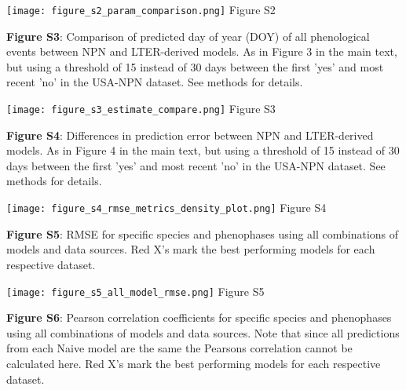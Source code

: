 \documentclass[a4paper,12pt]{article}
\begin{document}
\newpage

\begin{center}
	\centering
		\texttt{[image: figure\_s2\_param\_comparison.png]}
	Figure S2
\end{center}

\newpage

\newpage

\textbf{Figure S3}: Comparison of predicted day of year (DOY) of all phenological events between NPN
and LTER-derived models. As in Figure 3 in the main text, but using a threshold of 15 instead of 30 days between the first 'yes' and most recent 'no' in the USA-NPN dataset. See methods for details. 

\newpage

\begin{center}
	\centering
		\texttt{[image: figure\_s3\_estimate\_compare.png]}
	Figure S3
\end{center}

\newpage

\newpage

\textbf{Figure S4}: Differences in prediction error between NPN and LTER-derived models. As in Figure 4 in the main text, but using a threshold of 15 instead of 30 days between the first 'yes' and most recent 'no' in the USA-NPN dataset. See methods for details. 

\newpage

\begin{center}
	\centering
		\texttt{[image: figure\_s4\_rmse\_metrics\_density\_plot.png]}
	Figure S4
\end{center}

\newpage

\newpage

\textbf{Figure S5}: RMSE for specific species and phenophases using all combinations of models and data sources. Red X's mark the best performing models for each respective dataset. 

\newpage

\begin{center}
	\centering
		\texttt{[image: figure\_s5\_all\_model\_rmse.png]}
	Figure S5
\end{center}

\newpage
\textbf{Figure S6}: Pearson correlation coefficients for specific species and phenophases using all combinations of models and data sources. Note that since all predictions from each Naive model are the same the Pearsons correlation cannot be calculated here. Red X's mark the best performing models for each respective dataset.
\end{document}
